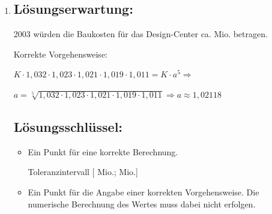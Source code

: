 \begin{langesbeispiel}
{\begin{enumerate}
\begin{itemize}
		Die Aufgabe ist auch dann als richtig gelöst zu werten, wenn bei korrektem Ansatz das Ergebnis aufgrund eines Rechenfehlers nicht richtig ist.
		\item  Ein Punkt für eine (sinngemäß) korrekte Deutung.
	\end{itemize}
	
	\item \subsection{Lösungserwartung:}
			
		2003 würden die Baukosten für das Design-Center ca.  Mio. betragen.\leer
		
		Korrekte Vorgehensweise:
		
		$K\cdot 1,032\cdot 1,023\cdot 1,021\cdot 1,019\cdot 1,011=K\cdot a^5 \Rightarrow$
		
		$a=\sqrt[5]{1,032\cdot 1,023\cdot 1,021\cdot 1,019\cdot 1,011} \Rightarrow a\approx 1,02118$

	\subsection{Lösungsschlüssel:}
	
\begin{itemize}
	\item Ein Punkt für eine korrekte Berechnung.
	
	Toleranzintervall [ Mio.;  Mio.]
	\item Ein Punkt für die Angabe einer korrekten Vorgehensweise. Die numerische Berechnung des Wertes muss dabei nicht erfolgen. 
\end{itemize}

\end{enumerate}}
		\end{langesbeispiel}